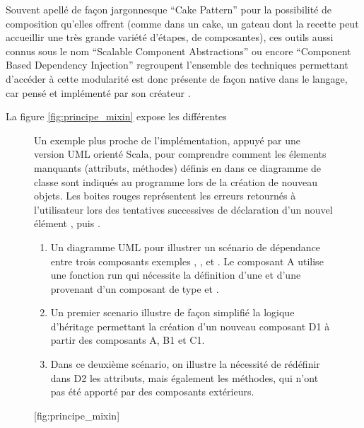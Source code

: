 
Souvent apellé de façon jargonnesque \foreignquote{english}{Cake Pattern} pour la possibilité de composition qu'elles offrent (comme dans un cake, un gateau dont la recette peut accueillir une très grande variété d'étapes, de composantes), ces outils aussi connus sous le nom \foreignquote{english}{Scalable Component Abstractions} ou encore \foreignquote{english}{Component Based Dependency Injection} regroupent  l'ensemble des techniques permettant d'accéder à cette modularité est donc présente de façon native dans le langage, car pensé et implémenté par son créateur \autocite{Oderskyxx}.


La figure \ref{fig:principe_mixin} expose les différentes

\begin{figure}[!htbp]
	\begin{sidecaption}[fortoc]{Un exemple plus proche de l'implémentation, appuyé par une version UML orienté Scala, pour comprendre comment les élements manquants (attributs, méthodes) définis en  dans ce diagramme de classe sont indiqués au programme lors de la création de nouveau objets. Les boites rouges représentent les erreurs retournés à l'utilisateur lors des tentatives successives de déclaration d'un nouvel élément , puis . \parbox{\marginparwidth}{
\begin{enumerate}[label=(\alph*),labelindent=\parindent,leftmargin=*]
       \item Un diagramme UML pour illustrer un scénario de dépendance entre trois composants exemples , , et . Le composant A utilise une fonction run qui nécessite la définition d'une  et d'une  provenant d'un composant de type  et .
       \item Un premier scenario illustre de façon simplifié la logique d'héritage permettant la création d'un nouveau composant D1 à partir des composants A, B1 et C1.
       \item Dans ce deuxième scénario, on illustre la nécessité de rédéfinir dans D2 les attributs, mais également les méthodes, qui n'ont pas été apporté par des composants extérieurs.
\end{enumerate}}}[fig:principe_mixin]
	\centering
	\end{sidecaption}
\end{figure}

